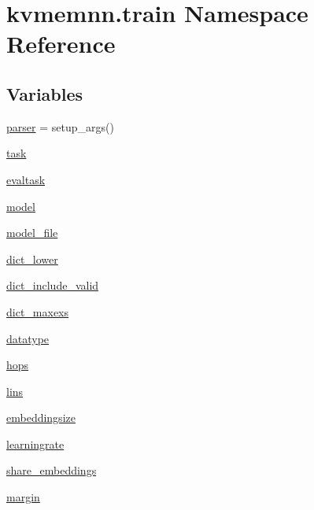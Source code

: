 \hypertarget{namespacekvmemnn_1_1train}{}\section{kvmemnn.\+train Namespace Reference}
\label{namespacekvmemnn_1_1train}
\subsection*{Variables}
\begin{DoxyCompactItemize}
\item 
\hyperlink{namespacekvmemnn_1_1train_ae5f5c954c5bd240b7abaf43df88b8249}{parser} = setup\+\_\+args()
\item 
\hyperlink{namespacekvmemnn_1_1train_a9aa7602bdf67a65bc87807263f7a2a5b}{task}
\item 
\hyperlink{namespacekvmemnn_1_1train_aca4c1b288905ff0aa850533a4c6f8b30}{evaltask}
\item 
\hyperlink{namespacekvmemnn_1_1train_a8af5e391feea32cee7a2b3d4e0e0d974}{model}
\item 
\hyperlink{namespacekvmemnn_1_1train_add5d9815156b41fa669489a582e0324d}{model\+\_\+file}
\item 
\hyperlink{namespacekvmemnn_1_1train_a788ed861b4c76040d0bcebca1e930b4b}{dict\+\_\+lower}
\item 
\hyperlink{namespacekvmemnn_1_1train_ab09dbdf5a90c6dd383946655b1a73558}{dict\+\_\+include\+\_\+valid}
\item 
\hyperlink{namespacekvmemnn_1_1train_a4ad01b9cc129b2bd739131d3f5150ceb}{dict\+\_\+maxexs}
\item 
\hyperlink{namespacekvmemnn_1_1train_a11027f4fb15005cd3f2470d81d7d093f}{datatype}
\item 
\hyperlink{namespacekvmemnn_1_1train_aff8e5ed3817bd03e567690ad220b580e}{hops}
\item 
\hyperlink{namespacekvmemnn_1_1train_ab0b01491ca30e576f6d9afb03c485903}{lins}
\item 
\hyperlink{namespacekvmemnn_1_1train_a4b5efbafba71b68daa50952c63e6539f}{embeddingsize}
\item 
\hyperlink{namespacekvmemnn_1_1train_a1000b74d78e4eed487c5640178d37613}{learningrate}
\item 
\hyperlink{namespacekvmemnn_1_1train_a70287f0e3ae71f95ee862ba2ee327f80}{share\+\_\+embeddings}
\item 
\hyperlink{namespacekvmemnn_1_1train_a60d96964fea38e9def380fd0edc927f2}{margin}
\item 

\end{DoxyCompactItemize}
